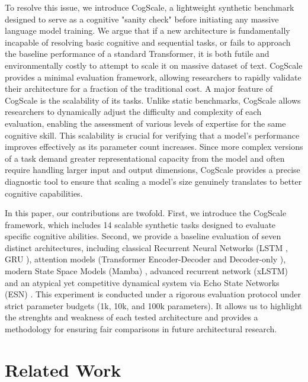 \documentclass{article}
\begin{document}
To resolve this issue, we introduce CogScale, a lightweight synthetic benchmark designed to serve as a cognitive "sanity check" before initiating any massive language model training. We argue that if a new architecture is fundamentally incapable of resolving basic cognitive and sequential tasks, or fails to approach the baseline performance of a standard Transformer, it is both futile and environmentally costly to attempt to scale it on massive dataset of text. CogScale provides a minimal evaluation framework, allowing researchers to rapidly validate their architecture for a fraction of the traditional cost. A major feature of CogScale is the scalability of its tasks. Unlike static benchmarks, CogScale allows researchers to dynamically adjust the difficulty and complexity of each evaluation, enabling the assessment of various levels of expertise for the same cognitive skill. This scalability is crucial for verifying that a model's performance improves effectively as its parameter count increases. Since more complex versions of a task demand greater representational capacity from the model and often require handling larger input and output dimensions, CogScale provides a precise diagnostic tool to ensure that scaling a model's size genuinely translates to better cognitive capabilities.

In this paper, our contributions are twofold. First, we introduce the CogScale framework, which includes 14 scalable synthetic tasks designed to evaluate specific cognitive abilities. Second, we provide a baseline evaluation of seven distinct architectures, including classical Recurrent Neural Networks (LSTM \cite{hochreiter1997long}, GRU \cite{cho2014learning}), attention models (Transformer Encoder-Decoder \cite{vaswani2017attention} and Decoder-only \cite{radford2018improving}), modern State Space Models (Mamba) \cite{gu2023mamba}, advanced recurrent network (xLSTM) \cite{beck2024xlstm} and an atypical yet competitive dynamical system via Echo State Networks (ESN) \cite{lukovsevivcius2009reservoir}. This experiment is conducted under a rigorous evaluation protocol under strict parameter budgets (1k, 10k, and 100k parameters). It allows us to highlight the strenghts and weakness of each tested architecture and provides a methodology for ensuring fair comparisons in future architectural research.



\section{Related Work}
\end{document}
